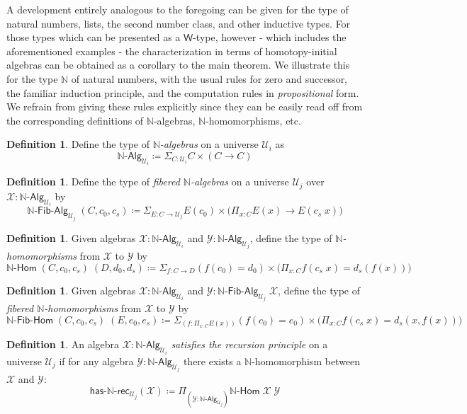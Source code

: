\documentclass[11pt]{article}
\newcommand{\X}{\mathcal{X}}
\newcommand{\Y}{\mathcal{Y}}
\newcommand{\prd}[1]{\Pi_{#1}}
\newcommand{\sm}[1]{\Sigma_{#1}}
\newcommand{\defeq}{\coloneqq}
\newcommand{\nat}{\ensuremath{\mathbb{N}}}
\newcommand{\W}{\mathsf{W}}
\newcommand{\UU}{\mathcal{U}}
\newcommand{\NatAlg}{\nat\text{-}\mathsf{Alg}}
\newcommand{\NatHom}{\nat\text{-}\mathsf{Hom}}
\newcommand{\HasNatRec}{\mathsf{has}\text{-}\nat\text{-}\mathsf{rec}}
\newcommand{\NatFibAlg}{\nat\text{-}\mathsf{Fib}\text{-}\mathsf{Alg}}
\newcommand{\NatFibHom}{\nat\text{-}\mathsf{Fib}\text{-}\mathsf{Hom}}
\theoremstyle{definition}
\newtheorem{definition}[theorem]{Definition}
\begin{document}
A development entirely analogous to the foregoing can be given for the type of natural numbers, lists, the second number class, and other inductive types. For those types which can be presented as a $\W$-type, however - which includes the aforementioned examples - the characterization in terms of homotopy-initial algebras can be obtained as a corollary to the main theorem. We illustrate this for the type $\nat$ of natural numbers, with the usual rules for zero and successor, the familiar induction principle, and the computation rules in \emph{propositional} form. We refrain from giving these rules explicitly since they can be easily read off from the corresponding definitions of $\nat$-algebras, $\nat$-homomorphisms, etc.

\begin{definition}\label{def:NatAlg}
Define the type of \emph{$\nat$-algebras} on a universe $\UU_i$ as 
\[\NatAlg_{\UU_i} \defeq \sm{C : \UU_i} C \times (C \to C) \]
\end{definition}

\begin{definition}\label{def:NatFibAlg}
Define the type of \emph{fibered $\nat$-algebras} on a universe $\UU_j$ over $\mathcal{X} : \NatAlg_{\UU_i}$ by
\[\NatFibAlg_{\UU_j} \; (C,c_0,c_s) \defeq \sm{E : C \to \UU_j} E(c_0) \times \big(\prd{x:C} E(x) \to E(c_s \; x)\big) \]
\end{definition}

\begin{definition}\label{def:NatHom}
Given algebras $\X : \NatAlg_{\UU_i}$ and $\Y : \NatAlg_{\UU_j}$, define the type of \emph{$\nat$-homomorphisms} from $\X$ to $\Y$ by 
\[\NatHom \; (C,c_0,c_s) \; (D,d_0,d_s) \defeq \sm{f:C \to D} (f(c_0) = d_0) \times \big(\prd{x:C} f(c_s\;x) = d_s(f(x))\big) \]
\end{definition}

\begin{definition}\label{def:NatFibHom}
Given algebras $\X : \NatAlg_{\UU_i}$ and $\Y : \NatFibAlg_{\UU_j} \; \X$, define the type of \emph{fibered $\nat$-homomorphisms} from $\X$ to $\Y$ by
\[\NatFibHom \; (C,c_0,c_s) \; (E,e_0,e_s) \defeq \sm{(f:\prd{x:C} E(x))} (f(c_0) = e_0) \times \big(\prd{x:C} f(c_s\;x) = d_s(x,f(x))\big) \]
\end{definition}

\begin{definition}\label{def:NatRec}
An algebra $\X : \NatAlg_{\UU_i}$ \emph{satisfies the recursion principle} on a universe $\UU_j$ if for any 
algebra $\Y : \NatAlg_{\UU_j}$ there exists a $\nat$-homomorphism between $\X$ and $\Y$:
\[\HasNatRec_{\UU_j}(\X) \defeq \prd{(\Y:\NatAlg_{\UU_j})} \NatHom \; \X \; \Y\] 
\end{definition}
\end{document}
